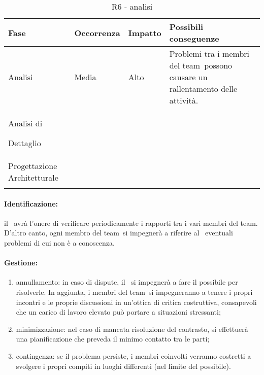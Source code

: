 \documentclass[../PianoProgetto.tex]{subfiles}
\begin{document}
	
	\begin{table}[h]
		\centering
		\begin{tabularx}{\textwidth}{F O O P}
			\toprule
			\textbf{Fase} & \textbf{Occorrenza} & \textbf{Impatto} & \textbf{Possibili conseguenze}\\
			\midrule
			Analisi & Media & Alto & Problemi tra i membri del team\g\ possono causare un rallentamento delle attività. \\
			\midrule
			Analisi di \par Dettaglio & & & \\
			\midrule
			Progettazione Architetturale & & & \\
			\bottomrule
		\end{tabularx}
		\caption{R6 - analisi}
		\label{tab:R6-analisi}	
	\end{table}
	
	\paragraph*{Identificazione:} il \responsabilediprogetto\ avrà l'onere di verificare periodicamente i rapporti tra i vari membri del team\g. D'altro canto, ogni membro del team\g\ si impegnerà a riferire al \responsabilediprogetto\ eventuali problemi di cui non è a conoscenza.
	
	\paragraph*{Gestione:}
	\begin{enumerate}
		\item annullamento: in caso di dispute, il \responsabilediprogetto\ si impegnerà a fare il possibile per risolverle. In aggiunta, i membri del team\g\ si impegneranno a tenere i propri incontri e le proprie discussioni in un'ottica di critica costruttiva, consapevoli che un carico di lavoro elevato può portare a situazioni stressanti;
		\item minimizzazione: nel caso di mancata risoluzione del contrasto, si effettuerà una pianificazione che preveda il minimo contatto tra le parti; 
		\item contingenza: se il problema persiste, i membri coinvolti verranno costretti a svolgere i propri compiti in luoghi differenti (nel limite del possibile).
	\end{enumerate}	
	
\end{document}
